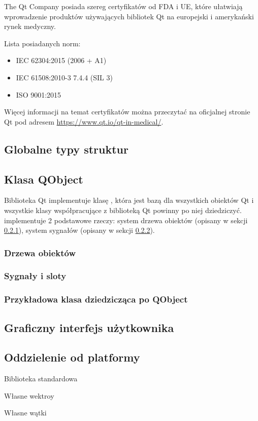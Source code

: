 \par
The Qt Company posiada szereg certyfikatów od FDA i UE, które ułatwiają wprowadzenie produktów używających bibliotek Qt na europejski i amerykański rynek medyczny.
\par
Lista posiadanych norm:
\begin{itemize}
    \item IEC 62304:2015 (2006 + A1)
    \item IEC 61508:2010-3 7.4.4 (SIL 3)
    \item ISO 9001:2015 
\end{itemize}
Więcej informacji na temat certyfikatów można przeczytać na oficjalnej stronie Qt pod adresem \url{https://www.qt.io/qt-in-medical/}.

\subsection{Globalne typy struktur}
\label{sec:qt-typedefs}


\subsection{Klasa QObject}

\qtclassExplanations

\par
Biblioteka Qt implementuje klasę , która jest bazą dla wszystkich obiektów Qt i wszystkie klasy współpracujące z biblioteką Qt powinny po niej dziedziczyć.
 implementuje 2 podstawowe rzeczy: system drzewa obiektów (opisany w sekcji \ref{sec:qt-pareting}), system sygnałów (opisany w sekcji \ref{sec:qt-signals}).

\subsubsection{Drzewa obiektów}
\label{sec:qt-pareting}


\subsubsection{Sygnały i sloty}
\label{sec:qt-signals}


\subsubsection{Przykładowa klasa dziedzicząca po QObject}


\subsection{Graficzny interfejs użytkownika}
\label{sec:qt-gui}


\subsection{Oddzielenie od platformy}

Biblioteka standardowa

Własne wektroy

Własne wątki
